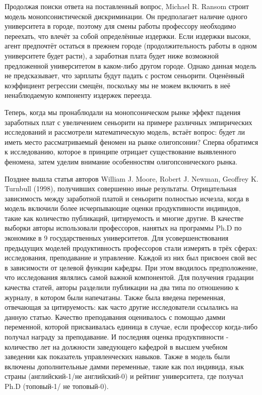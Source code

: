 \documentclass[a4paper, 12pt]{article}
\theoremstyle{definition}
\theoremstyle{plain}
\begin{document}
	Продолжая поиски ответа на поставленный вопрос, Michael R. Ransom строит модель монопсонистической дискриминации. Он предполагает наличие одного университета в городе, поэтому для смены работы профессору необходимо переехать, что влечёт за собой определённые издержки. Если издержки высоки, агент предпочтёт остаться в прежнем городе (продолжительность работы в одном университете будет расти), а заработная плата будет ниже возможной предложенной университетом в каком-либо другом городе. Однако данная модель не предсказывает, что зарплаты будут падать с ростом сеньорити. Оценённый коэффициент регрессии смещён, поскольку мы не можем включить в неё ненаблюдаемую компоненту издержек переезда. 
	
	Теперь, когда мы пронаблюдали на монопсоническом рынке эффект падения заработных плат с увеличением сеньорити на примере различных эмпирических исследований и рассмотрели математическую модель, встаёт вопрос: будет ли иметь место рассматриваемый феномен на рынке олигопсонии? Сперва обратимся к исследованию, которое в принципе отрицает существование выявленного феномена, затем уделим внимание особенностям олигопсонического рынка.
	
	Позднее вышла статья авторов William J. Moore, Robert J. Newman, Geoffrey K. Turnbull (1998), получивших совершенно иные результаты. Отрицательная зависимость  между заработной платой и сеньорити полностью исчезла, когда в модель включили более исчерпывающие оценки продуктивности индивидов, такие как количество публикаций, цитируемость и многие другие. В качестве выборки авторы использовали профессоров, нанятых на программы Ph.D по экономике в 9 государственных университетов. Для усовершенствования предыдущих моделей продуктивность профессоров стали измерять в трёх сферах: исследования, преподавание и управление. Каждой из них был присвоен свой вес в зависимости от целевой функции кафедры. При этом вводилось предположение, что  исследования являлись самой важной компонентой. Для получения градации качества статей, авторы разделили публикации на два типа по отношению к журналу, в котором были напечатаны. Также была введена переменная, отвечающая за цитируемость: как часто другие исследователи ссылались на данную статью. Качество преподавания оценивалось с помощью дамми переменной, которой присваивалась единица в случае, если профессор когда-либо получал награду за преподавание. И последняя оценка продуктивности - количество лет на должности заведующего кафедрой в высшем учебном заведении как показатель управленческих навыков. Также в модель были включены дополнительные дамми переменные, такие как пол индивида, язык страны (английский-1/не английский-0) и рейтинг университета, где получал Ph.D (топовый-1/ не топовый-0). 
	
\end{document}
